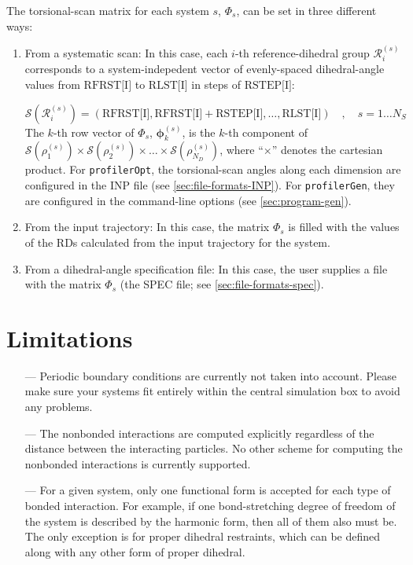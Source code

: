 \documentclass[10pt,a4paper,openany]{memoir}
\numberwithin{equation}{section}
\newcommand{\profileropt}[0]{\texttt{profilerOpt}}
\newcommand{\profilergen}[0]{\texttt{profilerGen}}
\begin{document}
The torsional-scan matrix for each system $s$, $\Phi_s$, can
be set in three different ways:
\begin{enumerate}
\item From a systematic scan: In this case, each $i$-th reference-dihedral group
  $\mathcal{R}_i^{(s)}$ corresponds to a system-indepedent vector of
  evenly-spaced dihedral-angle values from $\text{RFRST[I]}$ to $\text{RLST[I]}$
  in steps of $\text{RSTEP[I]}$:
  
  $$\mathcal{S}(\mathcal{R}_i^{(s)})  = (\text{RFRST[I]}, \text{RFRST[I]} + \text{RSTEP[I]}, \ldots , \text{RLST[I]}) \quad , \quad s=1 \ldots N_S $$
  The $k$-th row vector of $\Phi_s$, $\boldsymbol{\phi}_k^{(s)}$, is the $k$-th
  component of
  $\mathcal{S}({\rho_1^{(s)}}) \times \mathcal{S}({\rho_2^{(s)}}) \times \ldots
  \times \mathcal{S}(\rho_{N_D}^{(s)})$, where ``$\times$'' denotes the
  cartesian product.  For \profileropt{}, the torsional-scan angles along each
  dimension are configured in the INP file (see \autoref{sec:file-formats-INP}).
  For \profilergen{}, they are configured in the command-line options (see
  \autoref{sec:program-gen}).

\item From the input trajectory: In this case, the matrix $\Phi_s$ is
  filled with the values of the RDs calculated from the input
  trajectory for the system.
\item From a dihedral-angle specification file: In this case, the user
  supplies a file with the matrix $\Phi_s$ (the SPEC file; see
  \autoref{sec:file-formats-spec}).
\end{enumerate}


\section{Limitations}
\label{sec:limitations}

\begin{itemize}
\item[---] Periodic boundary conditions are currently not taken into
  account. Please make sure your systems fit entirely within the
  central simulation box to avoid any problems.
\item[---] The nonbonded interactions are computed explicitly
  regardless of the distance between the interacting particles. No
  other scheme for computing the nonbonded interactions is currently
  supported.
\item[---] For a given system, only one functional form is accepted
  for each type of bonded interaction. For example, if one
  bond-stretching degree of freedom of the system is described by the
  harmonic form, then all of them also must be. The only exception is
  for proper dihedral restraints, which can be defined along with any
  other form of proper dihedral.
\end{itemize}
\end{document}
